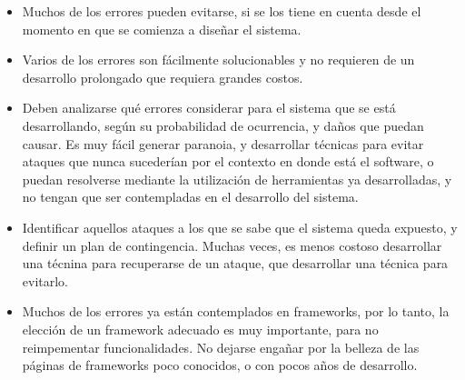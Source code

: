 \documentclass[a4paper,10pt]{article}
\begin{document}
\begin{itemize}
 \item Muchos de los errores pueden evitarse, si se los tiene en cuenta desde el momento en que se comienza
 a diseñar el sistema.
 \item Varios de los errores son fácilmente solucionables y no requieren de un desarrollo prolongado que requiera
 grandes costos.
 \item Deben analizarse qué errores considerar para el sistema que se está desarrollando, según su probabilidad
 de ocurrencia, y daños que puedan causar. Es muy fácil generar paranoia, y desarrollar técnicas para evitar
 ataques que nunca sucederían por el contexto en donde está el software, o puedan resolverse mediante la utilización
 de herramientas ya desarrolladas, y no tengan que ser contempladas en el desarrollo del sistema.
 \item Identificar aquellos ataques a los que se sabe que el sistema queda expuesto, y definir un plan de contingencia.
 Muchas veces, es menos costoso desarrollar una técnina para recuperarse de un ataque, que desarrollar una técnica para evitarlo.
 \item Muchos de los errores ya están contemplados en frameworks, por lo tanto, la elección de un framework adecuado
 es muy importante, para no reimpementar funcionalidades. No dejarse engañar por la belleza de las páginas de frameworks
 poco conocidos, o con pocos años de desarrollo.
\end{itemize}
\end{document}
